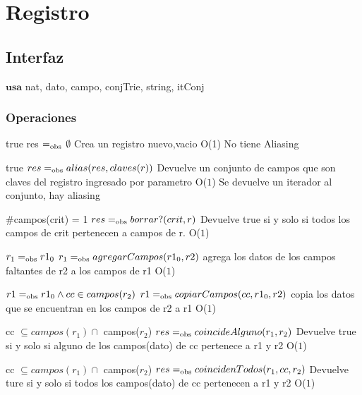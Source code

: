 
\section{Registro}

\subsection{Interfaz}

$\textbf{usa}$ {nat, dato, campo, conjTrie, string, itConj}




\subsubsection*{Operaciones}
{true}
{res $=_{\mathrm{obs}}$ $\emptyset$}
{Crea un registro nuevo,vacio}
{O(1)}
{No tiene Aliasing}



 {true}
 {$res =_{\mathrm{obs}} alias(res, claves(r))$}
 {Devuelve un conjunto de campos que son claves del registro ingresado por parametro}
 {O($1$)}
 {Se devuelve un iterador al conjunto, hay aliasing}

 {$\#$campos(crit) = 1}
 {$res =_{\mathrm{obs}} borrar?(crit, r)$}
 {Devuelve true si y solo si todos los campos de crit pertenecen a campos de r.}
 {O($1$)} 
 {}

 {$ r_1 =_{\mathrm{obs}} r1_0 $}
 {$r_1 =_{\mathrm{obs}} agregarCampos(r1_0, r2) $}
 {agrega los datos de los campos faltantes de r2 a los campos de r1}
 {O($1$)} 
 {}
 
{$r1 =_{\mathrm{obs}} r1_0 \land  cc \in campos(r_2) $}
{$r1 =_{\mathrm{obs}} copiarCampos(cc, r1_0, r2)$}
{copia los datos que se encuentran en los campos de r2 a r1}
{O($1$)}
{}%

 {cc $\subseteq campos(r_1)\cap$ campos($r_2$)}
 {$res =_{\mathrm{obs}} coincideAlguno(r_1, r_2)$}
 {Devuelve true si y solo si alguno de los campos(dato) de cc pertenece a r1 y r2}
 {O($1$)}
 {}
 
 {cc $\subseteq campos(r_1) \cap$ campos($r_2$)}
 {$res =_{\mathrm{obs}} coincidenTodos(r_1, cc, r_2) $}
 {Devuelve ture si y solo si todos los campos(dato) de cc pertenecen a r1 y r2}
 {O($1$) } 
 {}
 

